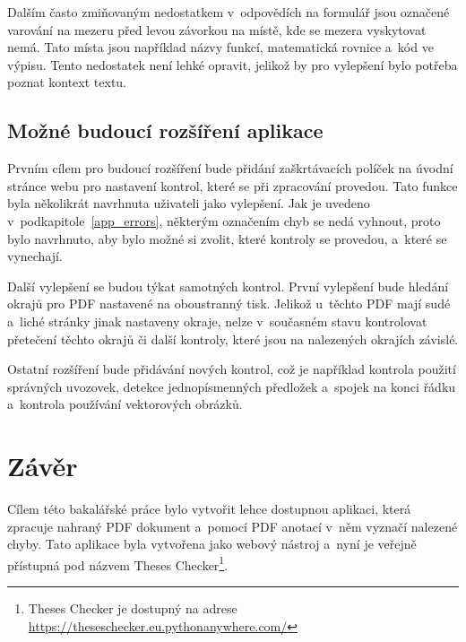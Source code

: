 Dalším často zmiňovaným nedostatkem v~odpovědích na formulář jsou označené
varování na mezeru před levou závorkou na místě, kde se mezera vyskytovat
nemá. Tato místa jsou například názvy funkcí, matematická rovnice a~kód
ve výpisu. Tento nedostatek není lehké opravit, jelikož by pro vylepšení
bylo potřeba poznat kontext textu.




\section{Možné budoucí rozšíření aplikace}
Prvním cílem pro budoucí rozšíření bude přidání zaškrtávacích políček na úvodní
stránce webu pro nastavení kontrol, které se při zpracování provedou. Tato funkce
byla několikrát navrhnuta uživateli jako vylepšení. Jak je uvedeno
v~podkapitole~\ref{app_errors}, některým označením chyb se nedá vyhnout, proto 
bylo navrhnuto, aby bylo možné si zvolit, které kontroly se provedou, a~které se
vynechají.

Další vylepšení se budou týkat samotných kontrol. První vylepšení bude hledání
okrajů pro PDF nastavené na oboustranný tisk. Jelikož u~těchto PDF mají sudé
a~liché stránky jinak nastaveny okraje, nelze v~současném stavu kontrolovat 
přetečení těchto okrajů či další kontroly, které jsou na nalezených okrajích
závislé.

Ostatní rozšíření bude přidávání nových kontrol, což je například  kontrola
použití správných uvozovek, detekce jednopísmenných předložek a~spojek na
konci řádku a~kontrola používání vektorových obrázků.






\chapter{Závěr}
Cílem této bakalářské práce bylo vytvořit lehce dostupnou aplikaci, která zpracuje
nahraný PDF dokument a~pomocí PDF anotací v~něm vyznačí nalezené chyby. Tato
aplikace byla vytvořena jako webový nástroj a~nyní je veřejně
přístupná pod názvem Theses Checker\footnote{Theses Checker je dostupný na adrese
\href{https://theseschecker.eu.pythonanywhere.com/}{https://theseschecker.eu.pythonanywhere.com/}}.


